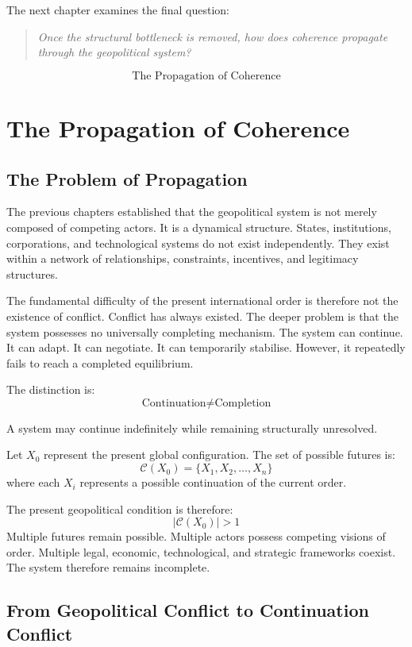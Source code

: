 \documentclass[11pt,openany]{book}
\theoremstyle{plain}
\theoremstyle{definition}
\begin{document}
The next chapter examines the final question:
\begin{quote}
\textit{Once the structural bottleneck is removed, how does coherence propagate through the geopolitical system?}
\end{quote}
\[
\boxed{
\text{The Propagation of Coherence}
}
\]

\chapter{The Propagation of Coherence}

\section{The Problem of Propagation}

The previous chapters established that the geopolitical system is not merely composed of competing actors. It is a dynamical structure. States, institutions, corporations, and technological systems do not exist independently. They exist within a network of relationships, constraints, incentives, and legitimacy structures.

The fundamental difficulty of the present international order is therefore not the existence of conflict. Conflict has always existed. The deeper problem is that the system possesses no universally completing mechanism. The system can continue. It can adapt. It can negotiate. It can temporarily stabilise. However, it repeatedly fails to reach a completed equilibrium.

The distinction is:
\[
\text{Continuation} \neq \text{Completion}
\]

A system may continue indefinitely while remaining structurally unresolved.

Let \(X_0\) represent the present global configuration. The set of possible futures is:
\[
\mathcal{C}(X_0) = \{X_1, X_2, \ldots, X_n\}
\]
where each \(X_i\) represents a possible continuation of the current order.

The present geopolitical condition is therefore:
\[
|\mathcal{C}(X_0)| > 1
\]
Multiple futures remain possible. Multiple actors possess competing visions of order. Multiple legal, economic, technological, and strategic frameworks coexist. The system therefore remains incomplete.

\section{From Geopolitical Conflict to Continuation Conflict}
\end{document}
